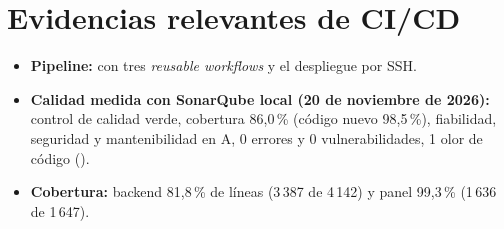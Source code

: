\section{Evidencias relevantes de CI/CD}
\begin{itemize}
  \item \textbf{Pipeline:}  con tres \emph{reusable workflows} y el despliegue por SSH.
  \item \textbf{Calidad medida con SonarQube local (20 de noviembre de 2026):} control de calidad verde, cobertura 86,0\,\% (código nuevo 98,5\,\%),
  fiabilidad, seguridad y mantenibilidad en A, 0 errores y 0 vulnerabilidades, 1 olor de código ().
  \item \textbf{Cobertura:} backend 81,8\,\% de líneas (3\,387 de 4\,142) y panel 99,3\,\% (1\,636 de 1\,647).
\end{itemize}
